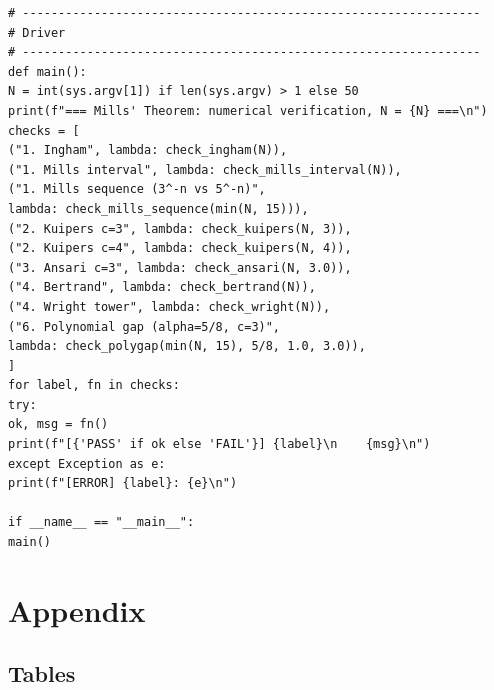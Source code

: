 \documentclass[11pt,reqno]{amsart}
\theoremstyle{blueplain}
\numberwithin{equation}{section}
\begin{document}
\begin{lstlisting}[style=python]
# ----------------------------------------------------------------
# Driver
# ----------------------------------------------------------------
def main():
N = int(sys.argv[1]) if len(sys.argv) > 1 else 50
print(f"=== Mills' Theorem: numerical verification, N = {N} ===\n")
checks = [
("1. Ingham", lambda: check_ingham(N)),
("1. Mills interval", lambda: check_mills_interval(N)),
("1. Mills sequence (3^-n vs 5^-n)",
lambda: check_mills_sequence(min(N, 15))),
("2. Kuipers c=3", lambda: check_kuipers(N, 3)),
("2. Kuipers c=4", lambda: check_kuipers(N, 4)),
("3. Ansari c=3", lambda: check_ansari(N, 3.0)),
("4. Bertrand", lambda: check_bertrand(N)),
("4. Wright tower", lambda: check_wright(N)),
("6. Polynomial gap (alpha=5/8, c=3)",
lambda: check_polygap(min(N, 15), 5/8, 1.0, 3.0)),
]
for label, fn in checks:
try:
ok, msg = fn()
print(f"[{'PASS' if ok else 'FAIL'}] {label}\n    {msg}\n")
except Exception as e:
print(f"[ERROR] {label}: {e}\n")

if __name__ == "__main__":
main()
\end{lstlisting}

\section{Appendix}
\label{sec:appendix}

\subsection{Tables}
\end{document}
